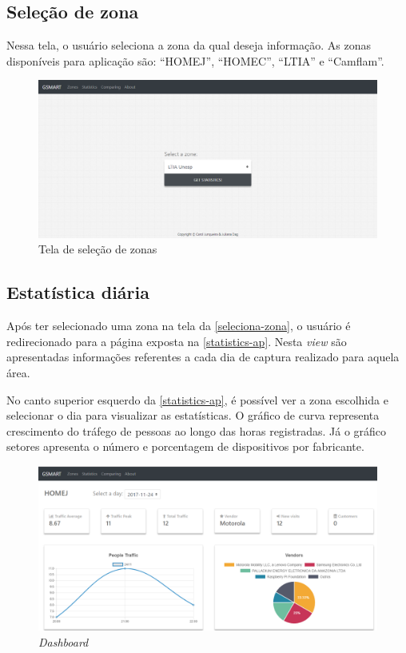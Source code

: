 \subsection{Seleção de zona}
\label{seleciona-zona}
Nessa tela, o usuário seleciona a zona da qual deseja informação. As zonas disponíveis para aplicação são:
``HOMEJ'', ``HOMEC'', ``LTIA'' e ``Camflam''.

\begin{figure}[!h]
  \caption{\label{zones-ap}Tela de seleção de zonas}
  \begin{center}
    \includegraphics[width=1.0\textwidth]{img/zones.png}
  \end{center}
\end{figure}

\subsection{Estatística diária}
\label{diaria}
Após ter selecionado uma zona na tela da \autoref{seleciona-zona}, o usuário é
redirecionado para a página exposta na \autoref{statistics-ap}. Nesta
\emph{view} são apresentadas informações referentes a cada dia de captura
realizado para aquela área.

No canto superior esquerdo da \autoref{statistics-ap}, é possível ver a zona
escolhida e selecionar o dia para visualizar as estatísticas. O gráfico de curva representa crescimento do tráfego de pessoas ao longo das
horas registradas. Já o gráfico setores apresenta o número e porcentagem de dispositivos por fabricante.

\begin{figure}[!h]
  \caption{\label{statistics-ap}\emph{Dashboard}}
  \begin{center}
    \includegraphics[width=1.0\textwidth]{img/statistics.png}
  \end{center}
\end{figure}

